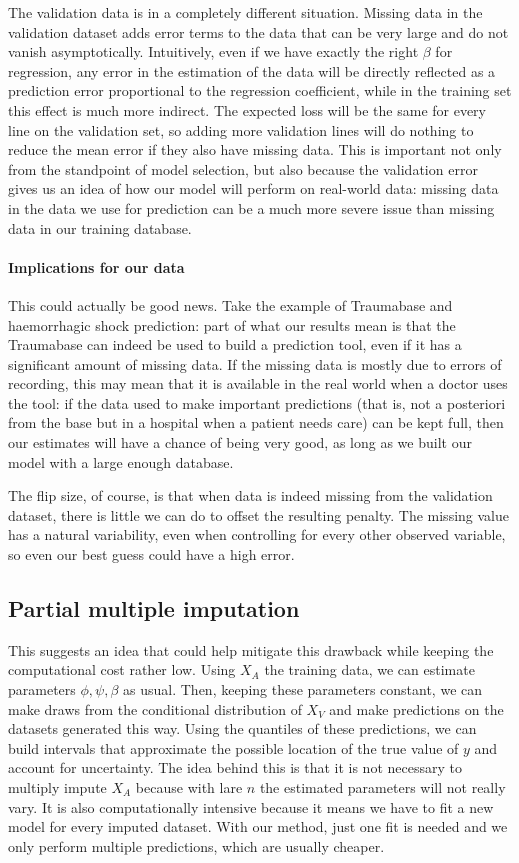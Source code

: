 \documentclass[12pt, a4paper]{memoir}
\begin{document}
The validation data is in a completely different situation. Missing data in the validation dataset adds error terms to the data that can be very large and do not vanish asymptotically. Intuitively, even if we have exactly the right $\beta$ for regression, any error in the estimation of the data will be directly reflected as a prediction error proportional to the regression coefficient, while in the training set this effect is much more indirect. The expected loss will be the same for every line on the validation set, so adding more validation lines will do nothing to reduce the mean error if they also have missing data. This is important not only from the standpoint of model selection, but also because the validation error gives us an idea of how our model will perform on real-world data: missing data in the data we use for prediction can be a much more severe issue than missing data in our training database.

\paragraph{Implications for our data}

This could actually be good news. Take the example of Traumabase and haemorrhagic shock prediction: part of what our results mean is that the Traumabase can indeed be used to build a prediction tool, even if it has a significant amount of missing data. If the missing data is mostly due to errors of recording, this may mean that it is available in the real world when a doctor uses the tool: if the data used to make important predictions (that is, not a posteriori from the base but in a hospital when a patient needs care) can be kept full, then our estimates will have a chance of being very good, as long as we built our model with a large enough database.

The flip size, of course, is that when data is indeed missing from the validation dataset, there is little we can do to offset the resulting penalty. The missing value has a natural variability, even when controlling for every other observed variable, so even our best guess could have a high error. 

\subsection{Partial multiple imputation}
This suggests an idea that could help mitigate this drawback while keeping the computational cost rather low. Using $X_A$ the training data, we can estimate parameters $\phi, \psi, \beta$ as usual. Then, keeping these parameters constant, we can make draws from the conditional distribution of $X_V$ and make predictions on the datasets generated this way. Using the quantiles of these predictions, we can build intervals that approximate the possible location of the true value of $y$ and account for uncertainty. The idea behind this is that it is not necessary to multiply impute $X_A$ because with lare $n$ the estimated parameters will not really vary. It is also computationally intensive because it means we have to fit a new model for every imputed dataset. With our method, just one fit is needed and we only perform multiple predictions, which are usually cheaper.
\end{document}

